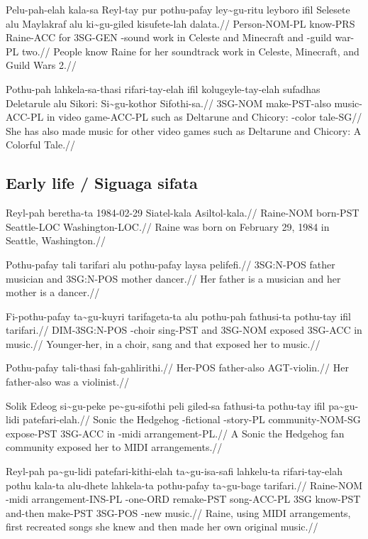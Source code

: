 \ex
\begingl 
\gla  Pelu-pah-elah kala-sa Reyl-tay pur pothu-pafay ley\~{}gu-ritu leyboro ifil Selesete alu Maylakraf alu ki\~{}gu-giled kisufete-lah dalata.//
\glb  Person-NOM-PL know-PRS Raine-ACC for 3SG-GEN \agradj-sound work in Celeste and Minecraft and \agradj-guild war-PL two.//
\glft People know Raine for her soundtrack work in Celeste, {} Minecraft, and Guild Wars 2.//
\endgl 
\xe

\ex
\begingl
\gla  Pothu-pah lahkela-sa-thasi rifari-tay-elah ifil kolugeyle-tay-elah sufadhas Deletarule alu Sikori: Si\~{}gu-kothor Sifothi-sa.//
\glb  3SG-NOM make-PST-also music-ACC-PL in video game-ACC-PL such as Deltarune and Chicory: \agradj-color tale-SG//
\glft She has also made music for other video games such as Deltarune and Chicory: A Colorful Tale.//
\endgl 
\xe

\subsection{Early life / Siguaga sifata}

\ex
\begingl
\gla  Reyl-pah beretha-ta  1984-02-29  Siatel-kala Asiltol-kala.//
\glb  Raine-NOM born-PST    Seattle-LOC  Washington-LOC.//
\glft Raine was born on February 29, 1984 in Seattle, Washington.//
\endgl
\xe

\ex
\begingl
\gla  Pothu-pafay tali  tarifari alu pothu-pafay laysa  pelifefi.//
\glb  3SG:N-POS father musician and 3SG:N-POS mother dancer.//
\glft Her father is a musician and her mother is a dancer.//
\endgl
\xe

\ex
\begingl
\gla  Fi-pothu-pafay ta\~{}gu-kuyri tarifageta-ta alu pothu-pah fathusi-ta pothu-tay ifil tarifari.//
\glb  DIM-3SG:N-POS \agradj-choir sing-PST and 3SG-NOM exposed 3SG-ACC in music.//
\glft Younger-her, in a choir, sang and that exposed her to music.//
\endgl
\xe

\ex
\begingl
\gla  Pothu-pafay tali-thasi  fah-gahlirithi.//
\glb  Her-POS father-also AGT-violin.//
\glft Her father-also was a violinist.//
\endgl
\xe

\ex
\begingl
\gla  Solik Edeog si\~{}gu-peke pe\~{}gu-sifothi peli giled-sa fathusi-ta pothu-tay ifil pa\~{}gu-lidi patefari-elah.//
\glb  Sonic the Hedgehog \agradj-fictional \agradj-story-PL community-NOM-SG expose-PST 3SG-ACC in \agradj-midi arrangement-PL.//
\glft A Sonic the Hedgehog fan community exposed her to MIDI arrangements.//
\endgl
\xe

\ex
\begingl
\gla  Reyl-pah pa\~{}gu-lidi patefari-kithi-elah ta\~{}gu-isa-safi lahkelu-ta rifari-tay-elah pothu kala-ta alu-dhete lahkela-ta pothu-pafay ta\~{}gu-bage tarifari.//
\glb  Raine-NOM \agradj-midi arrangement-INS-PL \agradj-one-ORD remake-PST song-ACC-PL 3SG know-PST and-then make-PST 3SG-POS \agradj-new music.//
\glft Raine, using MIDI arrangements, first recreated songs she knew and then made her own original music.//
\endgl
\xe

